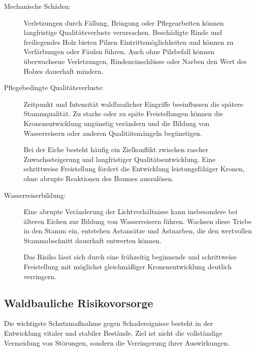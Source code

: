 \documentclass[twocolumn, bibliography=totoc, abstract=true]{scrartcl}
\begin{document}
\begin{description}
\item[Mechanische Schäden:] Verletzungen durch Fällung, Bringung oder Pflegearbeiten können langfristige Qualitätsverluste verursachen. Beschädigte Rinde und freiliegendes Holz bieten Pilzen Eintrittsmöglichkeiten und können zu Verfärbungen oder Fäulen führen. Auch ohne Pilzbefall können überwachsene Verletzungen, Rindeneinschlüsse oder Narben den Wert des Holzes dauerhaft mindern.
\item[Pflegebedingte Qualitätsverluste:] Zeitpunkt und Intensität waldbaulicher Eingriffe beeinflussen die spätere Stammqualität. Zu starke oder zu späte Freistellungen können die Kronenentwicklung ungünstig verändern und die Bildung von Wasserreisern oder anderen Qualitätsmängeln begünstigen.

Bei der Eiche besteht häufig ein Zielkonflikt zwischen rascher Zuwachssteigerung und langfristiger Qualitätsentwicklung. Eine schrittweise Freistellung fördert die Entwicklung leistungsfähiger Kronen, ohne abrupte Reaktionen des Baumes auszulösen.
\item[Wasserreiserbildung:] Eine abrupte Veränderung der Lichtverhältnisse kann insbesondere bei älteren Eichen zur Bildung von Wasserreisern führen. Wachsen diese Triebe in den Stamm ein, entstehen Astansätze und Astnarben, die den wertvollen Stammabschnitt dauerhaft entwerten können.

Das Risiko lässt sich durch eine frühzeitig beginnende und schrittweise Freistellung mit möglichst gleichmäßiger Kronenentwicklung deutlich verringern.
\end{description}

\subsection{Waldbauliche Risikovorsorge}

Die wichtigste Schutzmaßnahme gegen Schadereignisse besteht in der Entwicklung vitaler und stabiler Bestände. Ziel ist nicht die vollständige Vermeidung von Störungen, sondern die Verringerung ihrer Auswirkungen.
\end{document}

